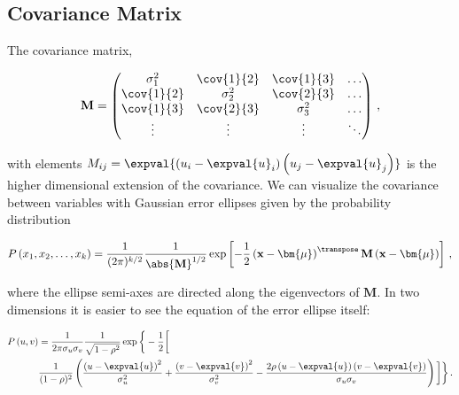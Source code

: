 \subsection{Covariance Matrix}
\label{stats:corr_covar:covar_matrix}

The covariance matrix,

\begin{align}
  \mathbf{M} = \begin{pmatrix}
    \sigma_1^2   & \cov{1}{2} & \cov{1}{3} & \ldots \\
    \cov{1}{2}   & \sigma_2^2 & \cov{2}{3} & \ldots \\
    \cov{1}{3}   & \cov{2}{3} & \sigma_3^2 & \ldots \\
    \vdots       & \vdots     & \vdots     & \ddots
  \end{pmatrix}\,,
\end{align}

\noindent with elements $M_{ij} = \expval{\left(u_{i} - \expval{u}_{i}\right)\left(u_{j}-\expval{u}_{j}\right)}$
is the higher dimensional extension of the covariance.
We can visualize the covariance between variables with
Gaussian error ellipses given by the probability distribution

\begin{equation}\label{eq:stats:P_error_ellipse_k}
P\left(x_{1},x_{2},\ldots,x_{k}\right) = \frac{1}{(2\pi)^{k/2}}\frac{1}{\abs{\mathbf{M}}^{1/2}}\exp\left[-\frac{1}{2}\left(\mathbf{x}-\bm{\mu}\right)^{\transpose}\mathbf{M}\left(\mathbf{x}-\bm{\mu}\right)\right]\,,
\end{equation}

\noindent where the ellipse semi-axes are directed along the eigenvectors of $\mathbf{M}$.
In two dimensions it is easier to see the equation of the error ellipse itself:

\begin{equation}\label{eq:stats:P_error_ellipse_2}
\begin{split}
P\left(u,v\right) &= \frac{1}{2\pi\sigma_{u}\sigma_{v}}\frac{1}{\sqrt{1-\rho^{2}}}\exp\bigg\{-\frac{1}{2}\bigg[ \\
&\frac{1}{(1-\rho)^{2}}\left(\frac{\left(u-\expval{u}\right)^{2}}{\sigma_{u}^{2}}+\frac{\left(v-\expval{v}\right)^{2}}{\sigma_{v}^{2}}-\frac{2\rho \left(u-\expval{u}\right)\left(v-\expval{v}\right)}{\sigma_{u}\sigma_{v}}\right)\bigg]\bigg\}\,.
\end{split}
\end{equation}

